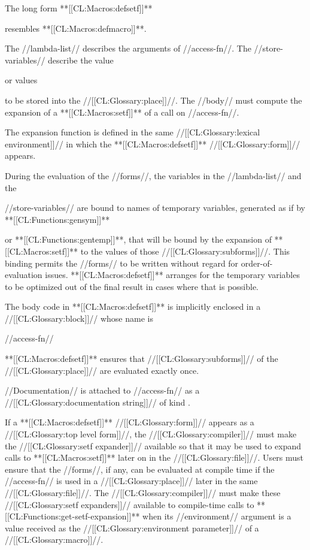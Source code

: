 The long form **[[CL:Macros:defsetf]]**

resembles **[[CL:Macros:defmacro]]**.

The //lambda-list// describes the arguments of //access-fn//. The //store-variables// describe the value

or values

to be stored into the //[[CL:Glossary:place]]//. The //body// must compute the expansion of a **[[CL:Macros:setf]]** of a call on //access-fn//.

The expansion function is defined in the same //[[CL:Glossary:lexical environment]]// in which the **[[CL:Macros:defsetf]]** //[[CL:Glossary:form]]// appears.

During the evaluation of the //forms//, the variables in the //lambda-list// and the

//store-variables// are bound to names of temporary variables, generated as if by **[[CL:Functions:gensym]]**

or **[[CL:Functions:gentemp]]**, that will be bound by the expansion of **[[CL:Macros:setf]]** to the values of those //[[CL:Glossary:subforms]]//. This binding permits the //forms// to be written without regard for order-of-evaluation issues. **[[CL:Macros:defsetf]]** arranges for the temporary variables to be optimized out of the final result in cases where that is possible.

The body code in **[[CL:Macros:defsetf]]** is implicitly enclosed in a //[[CL:Glossary:block]]// whose name is

//access-fn//

**[[CL:Macros:defsetf]]** ensures that //[[CL:Glossary:subforms]]// of the //[[CL:Glossary:place]]// are evaluated exactly once.

//Documentation// is attached to //access-fn// as a //[[CL:Glossary:documentation string]]// of kind .

If a **[[CL:Macros:defsetf]]** //[[CL:Glossary:form]]// appears as a //[[CL:Glossary:top level form]]//, the //[[CL:Glossary:compiler]]// must make the //[[CL:Glossary:setf expander]]// available so that it may be used to expand calls to **[[CL:Macros:setf]]** later on in the //[[CL:Glossary:file]]//. Users must ensure that the //forms//, if any, can be evaluated at compile time if the //access-fn// is used in a //[[CL:Glossary:place]]// later in the same //[[CL:Glossary:file]]//. The //[[CL:Glossary:compiler]]// must make these //[[CL:Glossary:setf expanders]]// available to compile-time calls to **[[CL:Functions:get-setf-expansion]]** when its //environment// argument is a value received as the //[[CL:Glossary:environment parameter]]// of a //[[CL:Glossary:macro]]//.

